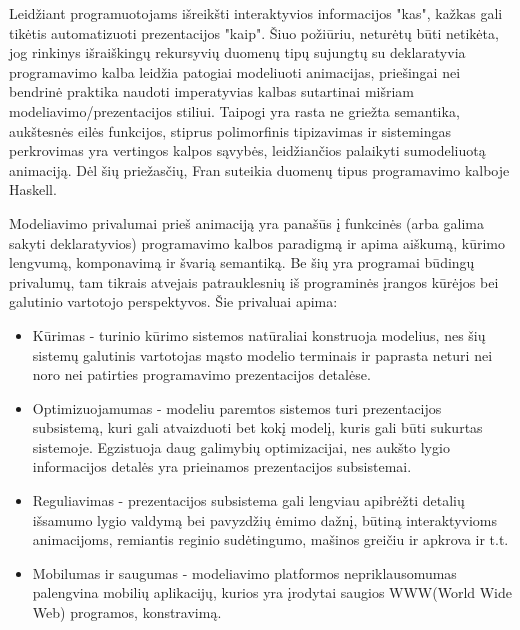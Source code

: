 Leidžiant programuotojams išreikšti interaktyvios informacijos "kas", kažkas gali tikėtis automatizuoti prezentacijos "kaip". Šiuo požiūriu, neturėtų būti netikėta, jog rinkinys išraiškingų rekursyvių duomenų tipų sujungtų su deklaratyvia programavimo kalba leidžia patogiai modeliuoti animacijas, priešingai nei bendrinė praktika naudoti imperatyvias kalbas sutartinai mišriam modeliavimo/prezentacijos stiliui. Taipogi yra rasta ne griežta semantika, aukštesnės eilės funkcijos, stiprus polimorfinis tipizavimas ir sistemingas perkrovimas yra vertingos kalpos sąvybės, leidžiančios palaikyti sumodeliuotą animaciją. Dėl šių priežasčių, Fran suteikia duomenų tipus programavimo kalboje Haskell.


Modeliavimo privalumai prieš animaciją yra panašūs į funkcinės (arba galima sakyti deklaratyvios) programavimo kalbos paradigmą ir apima aiškumą, kūrimo lengvumą, komponavimą ir švarią semantiką. Be šių yra programai būdingų privalumų, tam tikrais atvejais patrauklesnių iš programinės įrangos kūrėjos bei galutinio vartotojo perspektyvos. Šie privaluai apima:

\begin{itemize}

	\item Kūrimas - turinio kūrimo sistemos natūraliai konstruoja modelius, nes šių sistemų galutinis vartotojas mąsto modelio terminais ir paprasta neturi nei noro nei patirties programavimo prezentacijos detalėse.

	\item Optimizuojamumas - modeliu paremtos sistemos turi prezentacijos subsistemą, kuri gali atvaizduoti bet kokį modelį, kuris gali būti sukurtas sistemoje. Egzistuoja daug galimybių optimizacijai, nes aukšto lygio informacijos detalės yra prieinamos prezentacijos subsistemai.

	\item Reguliavimas - prezentacijos subsistema gali lengviau apibrėžti detalių išsamumo lygio valdymą bei pavyzdžių ėmimo dažnį, būtiną interaktyvioms animacijoms, remiantis reginio sudėtingumo, mašinos greičiu ir apkrova ir t.t.

	\item Mobilumas ir saugumas - modeliavimo platformos nepriklausomumas palengvina mobilių aplikacijų, kurios yra įrodytai saugios WWW(World Wide Web) programos, konstravimą.

\end{itemize}

